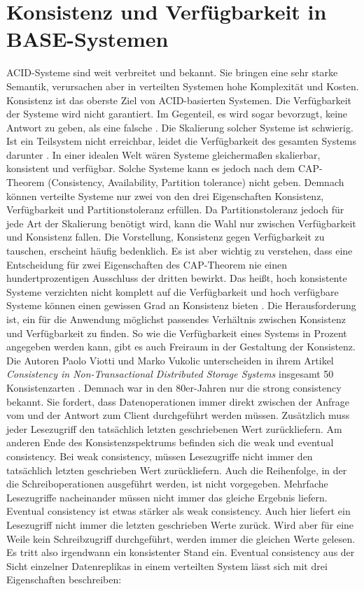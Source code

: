 \documentclass[12pt,oneside,a4paper,parskip]{scrbook}
\begin{document}
\section{Konsistenz und Verfügbarkeit in BASE-Systemen}
ACID-Systeme sind weit verbreitet und bekannt. Sie bringen eine sehr starke Semantik, verursachen aber in verteilten Systemen hohe Komplexität und Kosten. Konsistenz ist das oberste Ziel von ACID-basierten Systemen. Die Verfügbarkeit der Systeme wird nicht garantiert. Im Gegenteil, es wird sogar bevorzugt, keine Antwort zu geben, als eine falsche \cite{clusterBASE}. Die Skalierung solcher Systeme ist schwierig. Ist ein Teilsystem nicht erreichbar, leidet die Verfügbarkeit des gesamten Systems darunter \cite{BASE}. In einer idealen Welt wären Systeme gleichermaßen skalierbar, konsistent und verfügbar. Solche Systeme kann es jedoch nach dem CAP-Theorem (Consistency, Availability, Partition tolerance) nicht geben. Demnach können verteilte Systeme nur zwei von den drei Eigenschaften Konsistenz, Verfügbarkeit und Partitionstoleranz erfüllen. Da Partitionstoleranz jedoch für jede Art der Skalierung benötigt wird, kann die Wahl nur zwischen Verfügbarkeit und Konsistenz fallen. Die Vorstellung, Konsistenz gegen Verfügbarkeit zu tauschen, erscheint häufig bedenklich. Es ist aber wichtig zu verstehen, dass eine Entscheidung für zwei Eigenschaften des CAP-Theorem nie einen hundertprozentigen Ausschluss der dritten bewirkt.
Das heißt, hoch konsistente Systeme verzichten nicht komplett auf die Verfügbarkeit und hoch verfügbare Systeme können einen gewissen Grad an Konsistenz bieten \cite{cap}. Die Herausforderung ist, ein für die Anwendung möglichst passendes Verhältnis zwischen Konsistenz und Verfügbarkeit zu finden. So wie die Verfügbarkeit eines Systems in Prozent angegeben werden kann, gibt es auch Freiraum in der Gestaltung der Konsistenz. Die Autoren Paolo Viotti und Marko Vukolic unterscheiden in ihrem Artikel \textit{Consistency in Non-Transactional Distributed Storage Systems} insgesamt 50 Konsistenzarten \cite{consistency}. Demnach war in den 80er-Jahren nur die strong consistency bekannt. Sie fordert, dass Datenoperationen immer direkt zwischen der Anfrage vom und der Antwort zum Client durchgeführt werden müssen. Zusätzlich muss jeder Lesezugriff den tatsächlich letzten geschriebenen Wert zurückliefern. Am anderen Ende des Konsistenzspektrums befinden sich die weak und eventual consistency. Bei weak consistency, müssen Lesezugriffe nicht immer den tatsächlich letzten geschrieben Wert zurückliefern. Auch die Reihenfolge, in der die Schreiboperationen ausgeführt werden, ist nicht vorgegeben. Mehrfache Lesezugriffe nacheinander müssen nicht immer das gleiche Ergebnis liefern. Eventual consistency ist etwas stärker als weak consistency. Auch hier liefert ein Lesezugriff nicht immer die letzten geschrieben Werte zurück. Wird aber für eine Weile kein Schreibzugriff durchgeführt, werden immer die gleichen Werte gelesen. Es tritt also irgendwann ein konsistenter Stand ein. Eventual consistency aus der Sicht einzelner Datenreplikas in einem verteilten System lässt sich mit drei Eigenschaften beschreiben:
\end{document}

